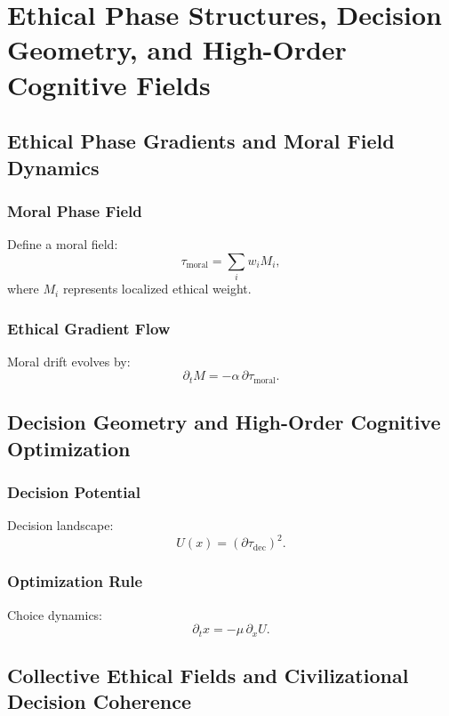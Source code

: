 

\part{Ethical Phase Structures, Decision Geometry, and High-Order Cognitive Fields}

\chapter{Ethical Phase Gradients and Moral Field Dynamics}

\section{Moral Phase Field}
Define a moral field:
\[
\tau_{\mathrm{moral}} = \sum_i w_i M_i,
\]
where \(M_i\) represents localized ethical weight.

\section{Ethical Gradient Flow}
Moral drift evolves by:
\[
\partial_t M = -\alpha\,\partial\tau_{\mathrm{moral}}.
\]

\chapter{Decision Geometry and High-Order Cognitive Optimization}

\section{Decision Potential}
Decision landscape:
\[
U(x) = (\partial\tau_{\mathrm{dec}})^2.
\]

\section{Optimization Rule}
Choice dynamics:
\[
\partial_t x = -\mu\,\partial_x U.
\]

\chapter{Collective Ethical Fields and Civilizational Decision Coherence}

